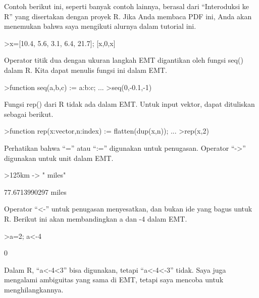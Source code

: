 \documentclass{article}
\begin{document}
\begin{eulernotebook}
\begin{eulercomment}
Contoh berikut ini, seperti banyak contoh lainnya, berasal dari
“Interoduksi ke R” yang disertakan dengan proyek R. Jika Anda membaca
PDF ini, Anda akan menemukan bahwa saya mengikuti alurnya dalam
tutorial ini.
\end{eulercomment}
\begin{eulerprompt}
>x=[10.4, 5.6, 3.1, 6.4, 21.7]; [x,0,x]
\end{eulerprompt}
\begin{euleroutput}
  [10.4,  5.6,  3.1,  6.4,  21.7,  0,  10.4,  5.6,  3.1,  6.4,  21.7]
\end{euleroutput}
\begin{eulercomment}
Operator titik dua dengan ukuran langkah EMT digantikan oleh fungsi
seq() dalam R. Kita dapat menulis fungsi ini dalam EMT.
\end{eulercomment}
\begin{eulerprompt}
>function seq(a,b,c) := a:b:c; ...
>seq(0,-0.1,-1)
\end{eulerprompt}
\begin{euleroutput}
  [0,  -0.1,  -0.2,  -0.3,  -0.4,  -0.5,  -0.6,  -0.7,  -0.8,  -0.9,  -1]
\end{euleroutput}
\begin{eulercomment}
Fungsi rep() dari R tidak ada dalam EMT. Untuk input vektor, dapat
dituliskan sebagai berikut.
\end{eulercomment}
\begin{eulerprompt}
>function rep(x:vector,n:index) := flatten(dup(x,n)); ...
>rep(x,2)
\end{eulerprompt}
\begin{euleroutput}
  [10.4,  5.6,  3.1,  6.4,  21.7,  10.4,  5.6,  3.1,  6.4,  21.7]
\end{euleroutput}
\begin{eulercomment}
Perhatikan bahwa “=” atau “:=” digunakan untuk penugasan. Operator
“-\textgreater{}” digunakan untuk unit dalam EMT.
\end{eulercomment}
\begin{eulerprompt}
>125km -> " miles"
\end{eulerprompt}
\begin{euleroutput}
  77.6713990297 miles
\end{euleroutput}
\begin{eulercomment}
Operator “\textless{}-” untuk penugasan menyesatkan, dan bukan ide yang bagus
untuk R. Berikut ini akan membandingkan a dan -4 dalam EMT.
\end{eulercomment}
\begin{eulerprompt}
>a=2; a<-4
\end{eulerprompt}
\begin{euleroutput}
  0
\end{euleroutput}
\begin{eulercomment}
Dalam R, “a\textless{}-4\textless{}3” bisa digunakan, tetapi “a\textless{}-4\textless{}-3” tidak. Saya juga
mengalami ambiguitas yang sama di EMT, tetapi saya mencoba untuk
menghilangkannya.


\end{eulercomment}
\end{eulernotebook}
\end{document}
